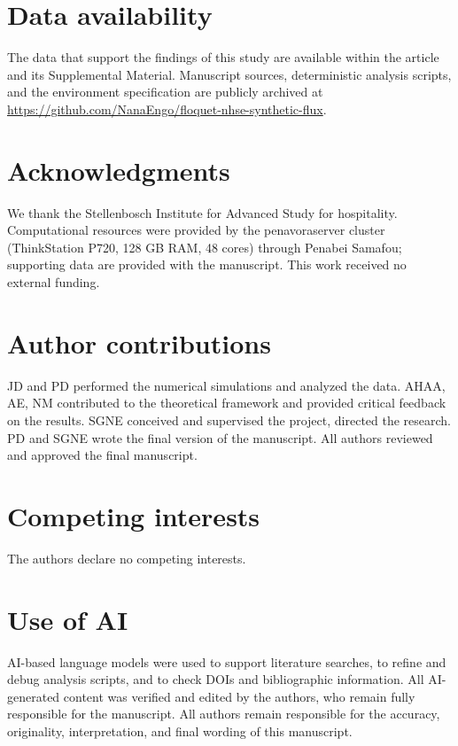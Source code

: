 \documentclass[aps,prxquantum,preprint,superscriptaddress,amsmath,amssymb]{revtex4-2}
\begin{document}
\section*{Data availability}

The data that support the findings of this study are available within the article and its Supplemental Material. Manuscript sources, deterministic analysis scripts, and the environment specification are publicly archived at \url{https://github.com/NanaEngo/floquet-nhse-synthetic-flux}.

\section*{Acknowledgments}

We thank the Stellenbosch Institute for Advanced Study for hospitality. Computational resources were provided by the penavoraserver cluster (ThinkStation P720, 128 GB RAM, 48 cores) through Penabei Samafou; supporting data are provided with the manuscript. This work received no external funding.

\section*{Author contributions}

JD and PD performed the numerical simulations and analyzed the data. AHAA, AE, NM contributed to the theoretical framework and provided critical feedback on the results. SGNE conceived and supervised the project, directed the research. PD and SGNE wrote the final version of the manuscript. All authors reviewed and approved the final manuscript.

\section*{Competing interests}

The authors declare no competing interests.

\section*{Use of AI}

AI-based language models were used to support literature searches, to refine and debug analysis scripts, and to check DOIs and bibliographic information. All AI-generated content was verified and edited by the authors, who remain fully responsible for the manuscript. All authors remain responsible for the accuracy, originality, interpretation, and final wording of this manuscript.



\end{document}
